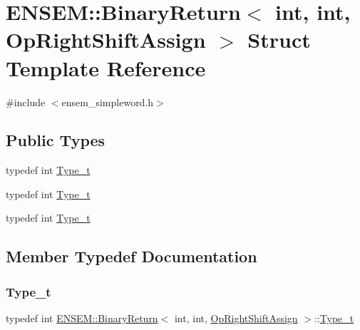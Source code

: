 \hypertarget{structENSEM_1_1BinaryReturn_3_01int_00_01int_00_01OpRightShiftAssign_01_4}{}\section{E\+N\+S\+EM\+:\+:Binary\+Return$<$ int, int, Op\+Right\+Shift\+Assign $>$ Struct Template Reference}
\label{structENSEM_1_1BinaryReturn_3_01int_00_01int_00_01OpRightShiftAssign_01_4}


{\ttfamily \#include $<$ensem\+\_\+simpleword.\+h$>$}

\subsection*{Public Types}
\begin{DoxyCompactItemize}
\item 
typedef int \mbox{\hyperlink{structENSEM_1_1BinaryReturn_3_01int_00_01int_00_01OpRightShiftAssign_01_4_aee34dbba921ba57b3f70c5f4d289e88d}{Type\+\_\+t}}
\item 
typedef int \mbox{\hyperlink{structENSEM_1_1BinaryReturn_3_01int_00_01int_00_01OpRightShiftAssign_01_4_aee34dbba921ba57b3f70c5f4d289e88d}{Type\+\_\+t}}
\item 
typedef int \mbox{\hyperlink{structENSEM_1_1BinaryReturn_3_01int_00_01int_00_01OpRightShiftAssign_01_4_aee34dbba921ba57b3f70c5f4d289e88d}{Type\+\_\+t}}
\end{DoxyCompactItemize}


\subsection{Member Typedef Documentation}
\mbox{\label{structENSEM_1_1BinaryReturn_3_01int_00_01int_00_01OpRightShiftAssign_01_4_aee34dbba921ba57b3f70c5f4d289e88d}} 
\subsubsection{\texorpdfstring{Type\_t}{Type\_t}\hspace{0.1cm}{\footnotesize\ttfamily [1/3]}}
{\footnotesize\ttfamily typedef int \mbox{\hyperlink{structENSEM_1_1BinaryReturn}{E\+N\+S\+E\+M\+::\+Binary\+Return}}$<$ int, int, \mbox{\hyperlink{structENSEM_1_1OpRightShiftAssign}{Op\+Right\+Shift\+Assign}} $>$\+::\mbox{\hyperlink{structENSEM_1_1BinaryReturn_3_01int_00_01int_00_01OpRightShiftAssign_01_4_aee34dbba921ba57b3f70c5f4d289e88d}{Type\+\_\+t}}}

